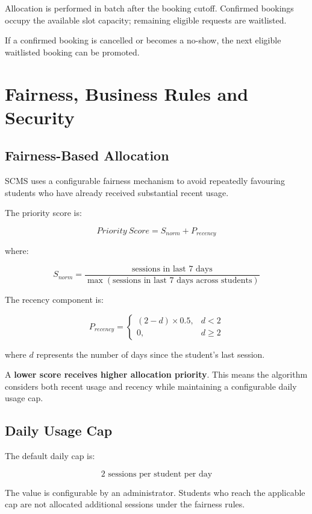 \documentclass[12pt,a4paper,oneside]{report}
\begin{document}
Allocation is performed in batch after the booking cutoff. Confirmed bookings occupy the available slot capacity; remaining eligible requests are waitlisted.

If a confirmed booking is cancelled or becomes a no-show, the next eligible waitlisted booking can be promoted.

\chapter{Fairness, Business Rules and Security}

\section{Fairness-Based Allocation}

SCMS uses a configurable fairness mechanism to avoid repeatedly favouring students who have already received substantial recent usage.

The priority score is:

\[
\boxed{Priority\ Score = S_{norm} + P_{recency}}
\]

where:

\[
S_{norm} =
\frac{\text{sessions in last 7 days}}
{\max(\text{sessions in last 7 days across students})}
\]

The recency component is:

\[
P_{recency} =
\begin{cases}
(2-d)\times 0.5, & d<2\\
0, & d\geq2
\end{cases}
\]

where $d$ represents the number of days since the student's last session.

A \textbf{lower score receives higher allocation priority}. This means the algorithm considers both recent usage and recency while maintaining a configurable daily usage cap.

\section{Daily Usage Cap}

The default daily cap is:

\[
\boxed{2\text{ sessions per student per day}}
\]

The value is configurable by an administrator. Students who reach the applicable cap are not allocated additional sessions under the fairness rules.
\end{document}

